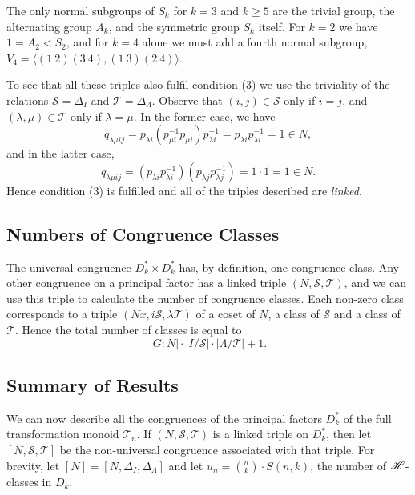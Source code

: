 The only normal subgroups of $S_k$ for $k=3$ and $k \geq 5$ are the trivial group, the
alternating group $A_k$, and the symmetric group $S_k$ itself.  For $k=2$ we
have $1 = A_2 < S_2$, and for $k=4$ alone we must add a fourth normal subgroup,
$V_4 = \langle (1~2)(3~4), (1~3)(2~4) \rangle$.

To see that all these triples also fulfil condition (3) we use the triviality of
the relations $\mathcal{S} = \Delta_I$ and $\mathcal{T} = \Delta_\Lambda$.
Observe that $(i,j) \in \mathcal{S}$ only if $i = j$, and $(\lambda,\mu) \in
\mathcal{T}$ only if $\lambda = \mu$.  In the former case, we have
$$q_{\lambda \mu i j} = p_{\lambda i} (p_{\mu i}^{-1} p_{\mu i}) p_{\lambda
  i}^{-1} = p_{\lambda i} p_{\lambda i}^{-1} = 1 \in N,$$
and in the latter case,
$$q_{\lambda \mu i j} = (p_{\lambda i} p_{\lambda i}^{-1}) (p_{\lambda j}
p_{\lambda j}^{-1}) = 1 \cdot 1 = 1 \in N.$$ Hence condition (3) is fulfilled
and all of the triples described are \textit{linked}.

\subsection{Numbers of Congruence Classes}
\label{sec:nrclasses}
The universal congruence $D_k^* \times D_k^*$ has, by definition, one congruence
class.  Any other congruence on a principal factor has a linked triple
$(N,\mathcal{S},\mathcal{T})$, and we can use this triple to calculate the
number of congruence classes.  Each non-zero class corresponds to a triple
$(Nx,i\mathcal{S},\lambda\mathcal{T})$ of a coset of $N$, a class of
$\mathcal{S}$ and a class of $\mathcal{T}$.  Hence the total number of classes
is equal to
$$|G:N| \cdot |I/\mathcal{S}| \cdot |\Lambda/\mathcal{T}| + 1.$$

\subsection{Summary of Results}
\label{sec:summary}
We can now describe all the congruences of the principal factors $D_k^*$ of the
full transformation monoid $\mathcal{T}_n$.  If $(N,\mathcal{S},\mathcal{T})$ is a linked
triple on $D_k^*$, then let $[N,\mathcal{S},\mathcal{T}]$ be the non-universal
congruence associated with that triple.
For brevity, let $[N] = [N, \Delta_I, \Delta_\Lambda]$ and
let $u_n = \binom{n}{k} \cdot S(n,k)$, the number of
$\mathrel{\mathscr{H}}$-classes in $D_k$.

